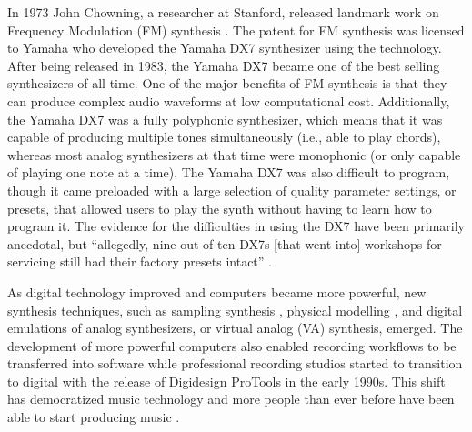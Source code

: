 In 1973 John Chowning, a researcher at Stanford, released landmark work on Frequency Modulation (FM) synthesis \cite{chowning1973synthesis}. The patent for FM synthesis was licensed to Yamaha who developed the Yamaha DX7 synthesizer using the technology. After being released in 1983, the Yamaha DX7 became one of the best selling synthesizers of all time. One of the major benefits of FM synthesis is that they can produce complex audio waveforms at low computational cost. Additionally, the Yamaha DX7 was a fully polyphonic synthesizer, which means that it was capable of producing multiple tones simultaneously (i.e., able to play chords), whereas most analog synthesizers at that time were monophonic (or only capable of playing one note at a time). The Yamaha DX7 was also difficult to program, though it came preloaded with a large selection of quality parameter settings, or presets, that allowed users to play the synth without having to learn how to program it. The evidence for the difficulties in using the DX7 have been primarily anecdotal, but ``allegedly, nine out of ten DX7s [that went into] workshops for servicing still had their factory presets intact” \cite{seago2004critical}.

As digital technology improved and computers became more powerful, new synthesis techniques, such as sampling synthesis \cite{mcguire2015musical}, physical modelling \cite{jaffe1983extensions}, and digital emulations of analog synthesizers, or virtual analog (VA) synthesis, emerged. The development of more powerful computers also enabled recording workflows to be transferred into software while professional recording studios started to transition to digital with the release of Digidesign ProTools in the early 1990s. This shift has democratized music technology and more people than ever before have been able to start producing music \cite{tavana2015democracy}.


